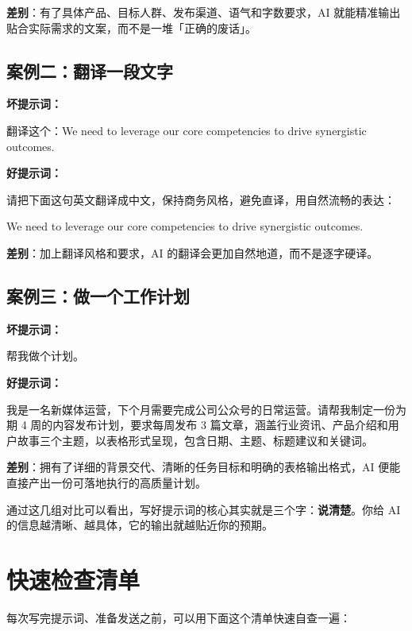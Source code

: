 \textbf{差别}：有了具体产品、目标人群、发布渠道、语气和字数要求，AI 就能精准输出贴合实际需求的文案，而不是一堆「正确的废话」。

\subsection*{案例二：翻译一段文字}

\textbf{坏提示词：}
\begin{promptbox}
翻译这个：We need to leverage our core competencies to drive synergistic outcomes.
\end{promptbox}

\textbf{好提示词：}
\begin{promptbox}
请把下面这句英文翻译成中文，保持商务风格，避免直译，用自然流畅的表达：

We need to leverage our core competencies to drive synergistic outcomes.
\end{promptbox}

\textbf{差别}：加上翻译风格和要求，AI 的翻译会更加自然地道，而不是逐字硬译。

\subsection*{案例三：做一个工作计划}

\textbf{坏提示词：}
\begin{promptbox}
帮我做个计划。
\end{promptbox}

\textbf{好提示词：}
\begin{promptbox}
我是一名新媒体运营，下个月需要完成公司公众号的日常运营。请帮我制定一份为期 4 周的内容发布计划，要求每周发布 3 篇文章，涵盖行业资讯、产品介绍和用户故事三个主题，以表格形式呈现，包含日期、主题、标题建议和关键词。
\end{promptbox}

\textbf{差别}：拥有了详细的背景交代、清晰的任务目标和明确的表格输出格式，AI 便能直接产出一份可落地执行的高质量计划。

通过这几组对比可以看出，写好提示词的核心其实就是三个字：\textbf{说清楚}。你给 AI 的信息越清晰、越具体，它的输出就越贴近你的预期。

\section{快速检查清单}

每次写完提示词、准备发送之前，可以用下面这个清单快速自查一遍：

